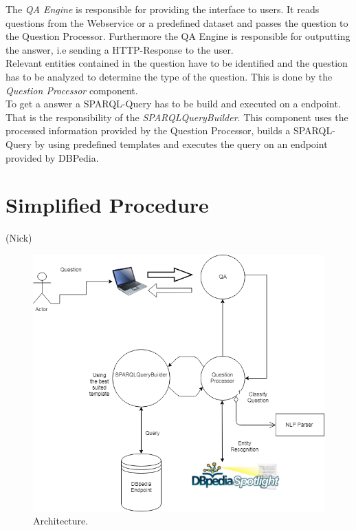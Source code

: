 \documentclass[runningheads]{llncs}
\begin{document}
The \emph{QA Engine} is responsible for providing the interface to users. It reads questions from the Webservice or a predefined dataset and passes the question to the Question Processor. Furthermore the QA Engine is responsible for outputting the answer, i.e sending a HTTP-Response to the user. \\

Relevant entities contained in the question have to be identified and the question has to be analyzed to determine the type of the question. This is done by the \emph{Question Processor} component. \\

To get a answer a SPARQL-Query has to be build and executed on a endpoint. That is the responsibility of the \emph{SPARQLQueryBuilder}. This component uses the processed information provided by the Question Processor, builds a SPARQL-Query by using predefined templates and executes the query on an endpoint provided by DBPedia. 

\pagebreak
\section{Simplified Procedure} (Nick)
\begin{figure}
	\includegraphics[width=\textwidth]{Architecture.PNG}
	
	\caption{Architecture.}
	\label{fig1} 
\end{figure}
\end{document}
